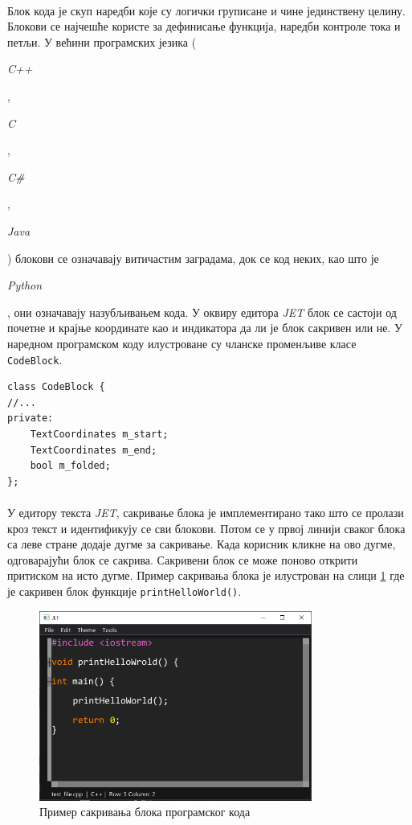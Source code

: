 \documentclass[12pt,oneside]{memoir}
\begin{document}
\paragraph{}
Блок кода је скуп наредби које су логички груписане и чине јединствену целину.
Блокови се најчешће користе за дефинисање функција, наредби контроле тока и петљи.
У већини програмских језика (\begin{latinica}\textit{C++}\end{latinica},
\begin{latinica}\textit{C}\end{latinica}, \begin{latinica}\textit{C\#}\end{latinica},
\begin{latinica}\textit{Java}\end{latinica}) блокови се означавају витичастим заградама, док се код неких, као што је \begin{latinica}\textit{Python}\end{latinica}, они означавају назубљивањем кода. У оквиру едитора \textit{JET} блок се састоји
од почетне и крајње координате као и индикатора да ли је блок сакривен или не.
У наредном програмском коду илустроване су чланске променљиве класе \verb|CodeBlock|.

\begin{verbatim}
class CodeBlock {
//...
private:
	TextCoordinates m_start;
	TextCoordinates m_end;
	bool m_folded;
};
\end{verbatim}

\paragraph{}
У едитору текста \textit{JET}, сакривање блока је имплементирано тако 
што се пролази кроз текст и идентификују се сви блокови. Потом се у првој
линији сваког блока са леве стране додаје дугме за сакривање. Када корисник
кликне на ово дугме, одговарајући блок се сакрива. Сакривени блок се може
поново открити притиском на исто дугме. Пример сакривања блока је илустрован
на слици \ref{fig:code_folding} где је сакривен блок функције \verb|printHelloWorld()|.

\begin{figure}[!ht]
	\centering
	\includegraphics[width=0.8\textwidth]{images/code_folding.png}
	\caption{Пример сакривања блока програмског кода}
	\label{fig:code_folding}
\end{figure} 
\end{document}
